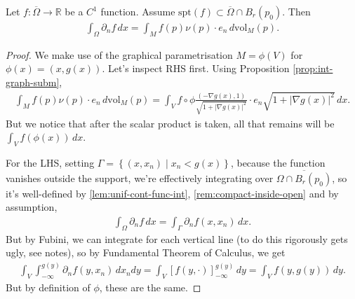 \begin{prop}\label{prop:div-thm-red}
	Let $f: \overline{ \Omega } \to \mathbb{R}$ be a $C^{1}$ function. Assume $\text{spt}(f) \subset \overline{ \Omega } \cap B_{r}(p_{0})$. Then
	\begin{align*}
		\int_{\Omega} \partial_{n} f \, dx = \int_{M} f(p) \nu(p) \cdot e_{n} \, d \text{vol}_{M}(p).
	\end{align*}
\end{prop}
\begin{proof}
	We make use of the graphical parametrisation $M = \phi(V)$ for $\phi(x) = (x,g(x))$. Let's inspect RHS first. Using Proposition \ref{prop:int-graph-subm},
	\begin{align*}
		\int_{M} f(p) \nu(p) \cdot e_{n} \, d \text{vol}_{M}(p) = \int_{V} f \circ \phi \frac{(-\nabla g(x), 1)}{\sqrt{1+\left| \nabla g(x) \right|^{2}}} \cdot e_{n} \sqrt{1 + \left| \nabla g(x) \right|^{2}}\, dx.
	\end{align*}
	But we notice that after the scalar product is taken, all that remains will be $\int_{V} f( \phi(x))  \, dx$.

	For the LHS, setting $\Gamma = \left\{ (x,x_{n}) \mid x_{n} < g(x) \right\}$, because the function vanishes outside the support, we're effectively integrating over $\overline{ \Omega \cap B_{r}(p_{0}) } $, so it's well-defined by \ref{lem:unif-cont-func-int}, \ref{rem:compact-inside-open} and by assumption,
	\begin{align*}
		\int_{\Omega} \partial_{n}f \, dx = \int_{\Gamma} \partial_{n} f(x,x_{n}) \, dx.
	\end{align*}
	But by Fubini, we can integrate for each vertical line (to do this rigorously gets ugly, see notes), so by Fundamental Theorem of Calculus, we get
	\begin{align*}
		\int_{V} \int_{-\infty}^{g(y)} \partial_{n}f(y, x_{n}) \, dx_{n} dy = \int_{V} [f(y, \cdot )]_{-\infty}^{g(y)} \, dy = \int_{V} f(y, g(y)) \, dy.
	\end{align*}
	But by definition of $\phi$, these are the same.
\end{proof}


